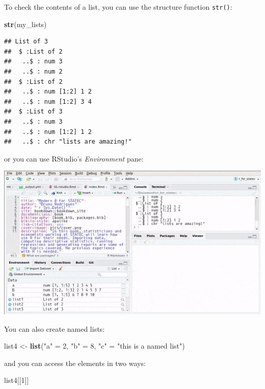 \documentclass[]{gitbook}
\newenvironment{Shaded}{\begin{snugshade}}{\end{snugshade}}
\newcommand{\DecValTok}[1]{\textcolor[rgb]{0.00,0.00,0.81}{#1}}
\newcommand{\KeywordTok}[1]{\textcolor[rgb]{0.13,0.29,0.53}{\textbf{#1}}}
\newcommand{\NormalTok}[1]{#1}
\newcommand{\StringTok}[1]{\textcolor[rgb]{0.31,0.60,0.02}{#1}}
\theoremstyle{definition}
\theoremstyle{definition}
\theoremstyle{definition}
\theoremstyle{remark}
\begin{document}
To check the contents of a list, you can use the structure function
\texttt{str()}:

\begin{Shaded}
\begin{Highlighting}[]
\KeywordTok{str}\NormalTok{(my_lists)}
\end{Highlighting}
\end{Shaded}

\begin{verbatim}
## List of 3
##  $ :List of 2
##   ..$ : num 3
##   ..$ : num 2
##  $ :List of 2
##   ..$ : num [1:2] 1 2
##   ..$ : num [1:2] 3 4
##  $ :List of 3
##   ..$ : num 3
##   ..$ : num [1:2] 1 2
##   ..$ : chr "lists are amazing!"
\end{verbatim}

or you can use RStudio's \emph{Environment} pane:

\includegraphics{pics/rstudio_environment_list.gif}

You can also create named lists:

\begin{Shaded}
\begin{Highlighting}[]
\NormalTok{list4 <-}\StringTok{ }\KeywordTok{list}\NormalTok{(}\StringTok{"a"}\NormalTok{ =}\StringTok{ }\DecValTok{2}\NormalTok{, }\StringTok{"b"}\NormalTok{ =}\StringTok{ }\DecValTok{8}\NormalTok{, }\StringTok{"c"}\NormalTok{ =}\StringTok{ "this is a named list"}\NormalTok{)}
\end{Highlighting}
\end{Shaded}

and you can access the elements in two ways:

\begin{Shaded}
\begin{Highlighting}[]
\NormalTok{list4[[}\DecValTok{1}\NormalTok{]]}
\end{Highlighting}
\end{Shaded}
\end{document}
